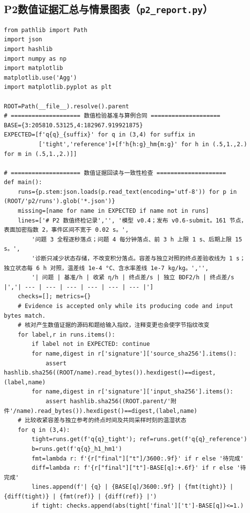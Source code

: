 \subsection{P2数值证据汇总与情景图表（\texttt{p2\_report.py}）}
\begin{Verbatim}[fontsize=\scriptsize,breaklines=true,breakanywhere=true]
from pathlib import Path
import json
import hashlib
import numpy as np
import matplotlib
matplotlib.use('Agg')
import matplotlib.pyplot as plt

ROOT=Path(__file__).resolve().parent
# ==================== 数值检验基准与算例合同 ====================
BASE={3:205810.53125,4:182967.919921875}
EXPECTED=[f'q{q}_{suffix}' for q in (3,4) for suffix in
          ['tight','reference']+[f'h{h:g}_hm{m:g}' for h in (.5,1.,2.) for m in (.5,1.,2.)]]

# ==================== 数值证据回读与一致性检查 ====================
def main():
    runs={p.stem:json.loads(p.read_text(encoding='utf-8')) for p in (ROOT/'p2/runs').glob('*.json')}
    missing=[name for name in EXPECTED if name not in runs]
    lines=['# P2 数值终检记录','', '模型 v0.4；发布 v0.6-submit。161 节点，表面加密指数 2，事件区间不宽于 0.02 s。',
        '问题 3 全程逐秒落点；问题 4 每分钟落点、前 3 h 上限 1 s、后期上限 15 s。',
        '诊断只减少状态存储，不改变积分落点。容差与独立对照的终点差验收线为 1 s；独立状态每 6 h 对照，温差线 1e-4 °C、含水率差线 1e-7 kg/kg。','',
        '| 问题 | 基准/h | 收紧 η/h | 终点差/s | 独立 BDF2/h | 终点差/s |','| --- | --- | --- | --- | --- | --- |']
    checks=[]; metrics={}
    # Evidence is accepted only while its producing code and input bytes match.
    # 核对产生数值证据的源码和题给输入指纹，注释变更也会使字节指纹改变
    for label,r in runs.items():
        if label not in EXPECTED: continue
        for name,digest in r['signature']['source_sha256'].items():
            assert hashlib.sha256((ROOT/name).read_bytes()).hexdigest()==digest,(label,name)
        for name,digest in r['signature']['input_sha256'].items():
            assert hashlib.sha256((ROOT.parent/'附件'/name).read_bytes()).hexdigest()==digest,(label,name)
    # 比较收紧容差与独立参考的终点时间及共同采样时刻的温湿状态
    for q in (3,4):
        tight=runs.get(f'q{q}_tight'); ref=runs.get(f'q{q}_reference')
        b=runs.get(f'q{q}_h1_hm1')
        fmt=lambda r: f'{r["final"]["t"]/3600:.9f}' if r else '待完成'
        diff=lambda r: f'{r["final"]["t"]-BASE[q]:+.6f}' if r else '待完成'
        lines.append(f'| {q} | {BASE[q]/3600:.9f} | {fmt(tight)} | {diff(tight)} | {fmt(ref)} | {diff(ref)} |')
        if tight: checks.append(abs(tight['final']['t']-BASE[q])<=1.)

\end{Verbatim}
